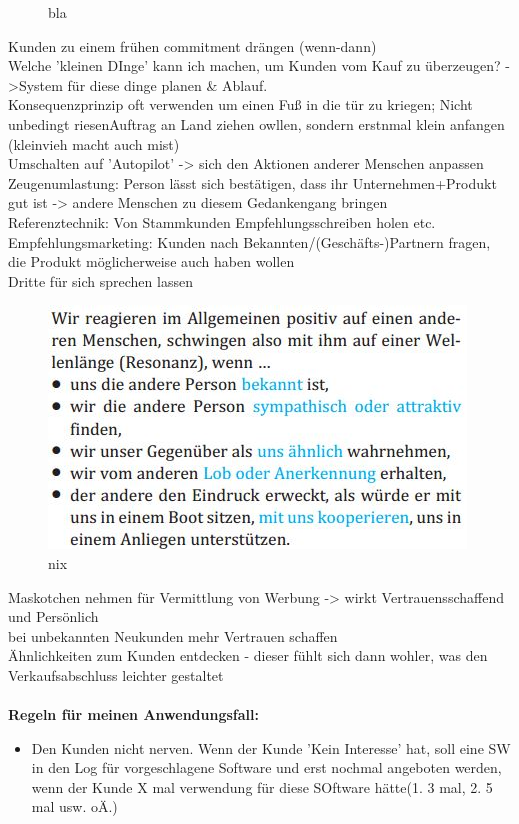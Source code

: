 \begin{itemize}
\begin{figure}[H]
		\caption{bla}
		\label{img:fragenBeiTerminvereinbarung}
	\end{figure}
	Kunden zu einem frühen commitment drängen (wenn-dann)\\
	Welche 'kleinen DInge' kann ich machen, um Kunden vom Kauf zu überzeugen? ->System für diese dinge planen \& Ablauf.\\
	Konsequenzprinzip oft verwenden um einen Fuß in die tür zu kriegen; Nicht unbedingt riesenAuftrag an Land ziehen owllen, sondern erstnmal klein anfangen (kleinvieh macht auch mist)\\
	Umschalten auf 'Autopilot' -> sich den Aktionen anderer Menschen anpassen\\
	Zeugenumlastung: Person lässt sich bestätigen, dass ihr Unternehmen+Produkt gut ist -> andere Menschen zu diesem Gedankengang bringen\\
	Referenztechnik: Von Stammkunden Empfehlungsschreiben holen etc.\\
	Empfehlungsmarketing: Kunden nach Bekannten/(Geschäfts-)Partnern fragen, die Produkt möglicherweise auch haben wollen\\
	Dritte für sich sprechen lassen
	\begin{figure}[H]
		\centering
		\includegraphics[width=0.734\columnwidth]{pictures/resonanzprinzip.jpg}
		\caption{nix}
		\label{img:resonanzprinzip}
	\end{figure}
	Maskotchen nehmen für Vermittlung von Werbung -> wirkt Vertrauensschaffend und Persönlich\\
	bei unbekannten Neukunden mehr Vertrauen schaffen\\
	Ähnlichkeiten zum Kunden entdecken - dieser fühlt sich dann wohler, was den Verkaufsabschluss leichter gestaltet\\
	\\
	\textbf{Regeln für meinen Anwendungsfall:}
	\begin{itemize}
		\item Den Kunden nicht nerven. Wenn der Kunde 'Kein Interesse' hat, soll eine SW in den Log für vorgeschlagene Software und erst nochmal angeboten werden, wenn der Kunde X mal verwendung für diese SOftware hätte(1. 3 mal, 2. 5 mal usw. oÄ.)

\end{itemize}
\end{itemize}
